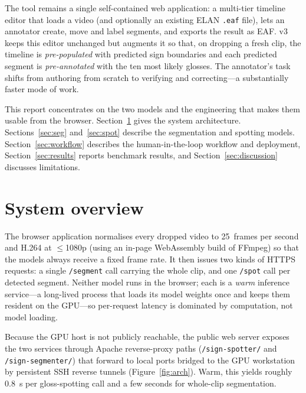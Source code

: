 \documentclass[11pt]{article}
\begin{document}
The tool remains a single self-contained web application: a multi-tier timeline editor that loads a
video (and optionally an existing ELAN \texttt{.eaf} file), lets an annotator create, move and label
segments, and exports the result as EAF. v3 keeps this editor unchanged but augments it so that, on
dropping a fresh clip, the timeline is \emph{pre-populated} with predicted sign boundaries and each
predicted segment is \emph{pre-annotated} with the ten most likely glosses. The annotator's task
shifts from authoring from scratch to verifying and correcting---a substantially faster mode of work.

This report concentrates on the two models and the engineering that makes them usable from the
browser. Section~\ref{sec:overview} gives the system architecture. Sections~\ref{sec:seg}
and~\ref{sec:spot} describe the segmentation and spotting models. Section~\ref{sec:workflow}
describes the human-in-the-loop workflow and deployment, Section~\ref{sec:results} reports benchmark
results, and Section~\ref{sec:discussion} discusses limitations.

\section{System overview}\label{sec:overview}
The browser application normalises every dropped video to 25~frames per second and H.264 at
$\le$1080p (using an in-page WebAssembly build of FFmpeg) so that the models always receive a fixed
frame rate. It then issues two kinds of HTTPS requests: a single \texttt{/segment} call carrying the
whole clip, and one \texttt{/spot} call per detected segment. Neither model runs in the browser; each
is a \emph{warm} inference service---a long-lived process that loads its model weights once and keeps
them resident on the GPU---so per-request latency is dominated by computation, not model loading.

Because the GPU host is not publicly reachable, the public web server exposes the two services
through Apache reverse-proxy paths (\texttt{/sign-spotter/} and \texttt{/sign-segmenter/}) that
forward to local ports bridged to the GPU workstation by persistent SSH reverse tunnels
(Figure~\ref{fig:arch}). Warm, this yields roughly 0.8~s per gloss-spotting call and a few seconds
for whole-clip segmentation.
\end{document}
